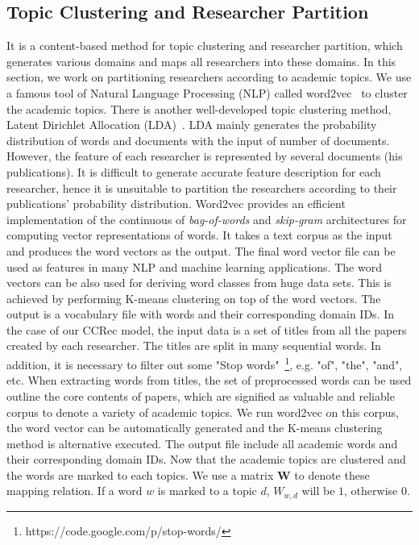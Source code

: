 \documentclass[10pt,letterpaper]{article}
\begin{document}
\subsection*{Topic Clustering and Researcher Partition}
It is a content-based method for topic clustering and researcher partition, which generates various domains and maps all researchers into these domains. In this section, we work on partitioning researchers according to academic topics. We use a famous tool of Natural Language Processing (NLP) called word2vec~\cite{goldberg2014word2vec} to cluster the  academic topics. There is another well-developed topic clustering method, Latent Dirichlet Allocation (LDA)~\cite{blei2003latent}. LDA mainly generates the probability distribution of words and documents with the input of number of documents. However, the feature of each researcher is represented by several documents (his publications). It is difficult to generate accurate feature description for each researcher, hence it is unsuitable to partition the researchers according to their publications' probability distribution. Word2vec provides an efficient implementation of the continuous of \emph{bag-of-words} and \emph{skip-gram} architectures for computing vector representations of words. It takes a text corpus as the input and produces the word vectors as the output. The final word vector file can be used as features in many NLP and machine learning applications. The word vectors can be also used for deriving word classes from huge data sets. This is achieved by performing K-means clustering on top of the word vectors. The output is a vocabulary file with words and their corresponding domain IDs. In the case of our CCRec model, the input data is a set of titles from all the papers created by each researcher. The titles are split in many sequential words. In addition, it is necessary to filter out some "Stop words"~\footnote{https://code.google.com/p/stop-words/}, e.g. "of", "the", "and", etc. When extracting words from titles, the set of preprocessed words can be used outline the core contents of papers, which are signified as valuable and reliable corpus to denote a variety of academic topics. We run word2vec on this corpus, the word vector can be automatically generated and the K-means clustering method is alternative executed. The output file include all academic words and their corresponding domain IDs. Now that the academic topics are clustered and the words are marked to each topics. We use a matrix $\mathbf{W}$ to denote these mapping relation. If a word $w$ is marked to a topic $d$, $W_{w,d}$ will be $1$, otherwise 0.
\end{document}
